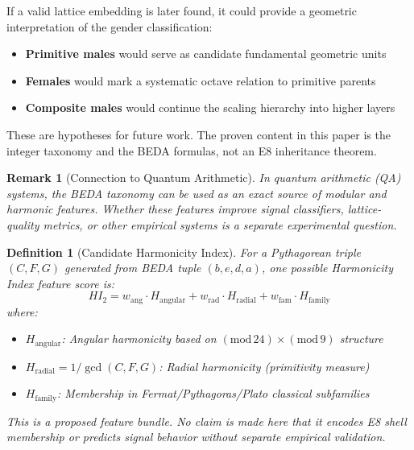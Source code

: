 \documentclass[12pt]{article}
\newtheorem{definition}{Definition}
\newtheorem{remark}{Remark}
\begin{document}
If a valid lattice embedding is later found, it could provide a geometric interpretation of the gender classification:

\begin{itemize}
\item \textbf{Primitive males} would serve as candidate fundamental geometric units
\item \textbf{Females} would mark a systematic octave relation to primitive parents
\item \textbf{Composite males} would continue the scaling hierarchy into higher layers
\end{itemize}

These are hypotheses for future work. The proven content in this paper is the integer taxonomy and the BEDA formulas, not an E8 inheritance theorem.

\begin{remark}[Connection to Quantum Arithmetic]
In quantum arithmetic (QA) systems, the BEDA taxonomy can be used as an exact source of modular and harmonic features. Whether these features improve signal classifiers, lattice-quality metrics, or other empirical systems is a separate experimental question.
\end{remark}

\begin{definition}[Candidate Harmonicity Index]
For a Pythagorean triple $(C, F, G)$ generated from BEDA tuple $(b, e, d, a)$, one possible \emph{Harmonicity Index} feature score is:
\begin{equation}
HI_2 = w_{\text{ang}} \cdot H_{\text{angular}} + w_{\text{rad}} \cdot H_{\text{radial}} + w_{\text{fam}} \cdot H_{\text{family}}
\end{equation}
where:
\begin{itemize}
\item $H_{\text{angular}}$: Angular harmonicity based on $(\text{mod}\, 24) \times (\text{mod}\, 9)$ structure
\item $H_{\text{radial}} = 1/\gcd(C,F,G)$: Radial harmonicity (primitivity measure)
\item $H_{\text{family}}$: Membership in Fermat/Pythagoras/Plato classical subfamilies
\end{itemize}

This is a proposed feature bundle. No claim is made here that it encodes E8 shell membership or predicts signal behavior without separate empirical validation.
\end{definition}
\end{document}

